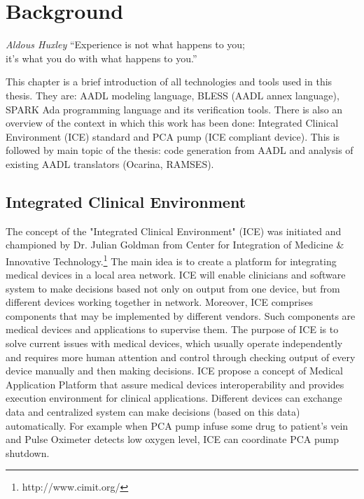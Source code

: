 
\cleardoublepage


\chapter{Background}
\label{background}

\begin{chapquote}{\textit{Aldous Huxley}}
``Experience is not what happens to you; \\
it's what you do with what happens to you.''
\end{chapquote}

This chapter is a brief introduction of all technologies and tools used in this thesis. They are: AADL modeling language, BLESS (AADL annex language), SPARK Ada programming language and its verification tools. There is also an overview of the context in which this work has been done: Integrated Clinical Environment (ICE) standard and PCA pump (ICE compliant device). This is followed by main topic of the thesis: code generation from AADL and analysis of existing AADL translators (Ocarina, RAMSES).



\section{Integrated Clinical Environment}
\label{background:ice}

The concept of the "Integrated Clinical Environment" (ICE) was initiated and championed by Dr. Julian Goldman from Center for Integration of Medicine \& Innovative Technology.\footnote{http://www.cimit.org/} The main idea is to create a platform for integrating medical devices in a local area network. ICE will enable clinicians and software system to make decisions based not only on output from one device, but from different devices working together in network. Moreover, ICE comprises components that may be implemented by different vendors. Such components are medical devices and applications to supervise them. The purpose of ICE is to solve current issues with medical devices, which usually operate independently and requires more human attention and control through checking output of every device manually and then making decisions. ICE propose a concept of Medical Application Platform \cite{MedicalApplicationPlatforms:Paper} that assure medical devices interoperability and provides execution environment for clinical applications. Different devices can exchange data and centralized system can make decisions (based on this data) automatically. For example when PCA pump infuse some drug to patient's vein and Pulse Oximeter detects low oxygen level, ICE can coordinate PCA pump shutdown. 

